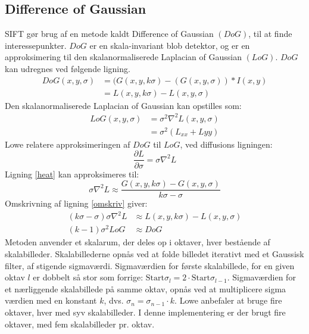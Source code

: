 \subsection{Difference of Gaussian}
\label{sec:dog}
SIFT gør brug af en metode kaldt Difference of Gaussian $(DoG)$, til at finde interessepunkter. $DoG$ er en skala-invariant blob detektor, og er en approksimering til den skalanormaliserede Laplacian of Gaussian $(LoG)$. $DoG$ kan udregnes ved følgende ligning.
\begin{equation}
\begin{split}
DoG(x,y,\sigma) &= (G(x,y,k\sigma)-(G(x,y,\sigma))\ast I(x,y) \\
           &= L(x,y,k \sigma)-L(x,y,\sigma)
\end{split}
\label{dog}
\end{equation}
Den skalanormaliserede Laplacian of Gaussian kan opstilles som:
\begin{equation}
\begin{split}
LoG(x,y,\sigma)&=\sigma^2\nabla^2L(x,y,\sigma) \\
&= \sigma^2(L_{xx}+L{yy})
\end{split}
\end{equation}
Lowe relatere approksimeringen af $DoG$ til $LoG$, ved diffusions ligningen:
\begin{equation}
\dfrac{\partial L}{\partial \sigma} = \sigma \nabla^2L
\label{heat}
\end{equation}
Ligning \eqref{heat} kan approksimeres til:
\begin{equation}
\sigma \nabla^2L \approx \frac{G(x,y,k\sigma) - G(x,y,\sigma)}{k\sigma-\sigma}
\label{omskriv}
\end{equation}
Omskrivning af ligning \eqref{omskriv} giver:
\begin{equation}
\begin{split}
(k\sigma-\sigma)\sigma\nabla^2L &\approx L(x,y,k\sigma)-L(x,y,\sigma) \\
(k-1)\sigma^2LoG &\approx DoG
\end{split}
\end{equation}
Metoden anvender et skalarum, der deles op i oktaver, hver bestående af skalabilleder. Skalabillederne opnås ved at folde billedet iterativt med et Gaussisk filter, af stigende sigmaværdi. Sigmaværdien for første skalabillede, for en given oktav $l$ er dobbelt så stor som forrige: $\text{Start} \sigma_l = 2 \cdot \text{Start} \sigma_{l-1}$. Sigmaværdien for et nærliggende skalabillede på samme oktav, opnås ved at multiplicere sigma værdien med en konstant $k$, dvs. $\sigma_n = \sigma_{n-1} \cdot k$. Lowe anbefaler at bruge fire oktaver, hver med syv skalabilleder. I denne implementering er der brugt fire oktaver, med fem skalabilleder pr. oktav.

